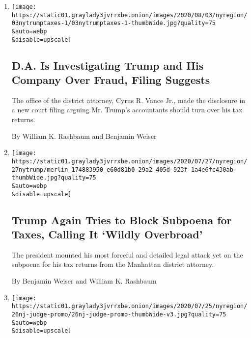 \begin{enumerate}
\def\labelenumi{\arabic{enumi}.}
\item
  \href{/2020/08/03/nyregion/donald-trump-taxes-cyrus-vance.html}{}

  \texttt{[image: https://static01.graylady3jvrrxbe.onion/images/2020/08/03/nyregion/03nytrumptaxes-1/03nytrumptaxes-1-thumbWide.jpg?quality=75\\\&auto=webp\\\&disable=upscale]}

  \hypertarget{da-is-investigating-trump-and-his-company-over-fraud-filing-suggests}{%
  \subsection{D.A. Is Investigating Trump and His Company Over Fraud,
  Filing
  Suggests}\label{da-is-investigating-trump-and-his-company-over-fraud-filing-suggests}}

  The office of the district attorney, Cyrus R. Vance Jr., made the
  disclosure in a new court filing arguing Mr. Trump's accountants
  should turn over his tax returns.

  By William K. Rashbaum and Benjamin Weiser
\item
  \href{/2020/07/27/nyregion/donald-trump-taxes-cyrus-vance.html}{}

  \texttt{[image: https://static01.graylady3jvrrxbe.onion/images/2020/07/27/nyregion/27nytrump/merlin\_174883950\_e60d81b0-29a2-405d-923f-1a4e6fc430ab-thumbWide.jpg?quality=75\\\&auto=webp\\\&disable=upscale]}

  \hypertarget{trump-again-tries-to-block-subpoena-for-taxes-calling-it-wildly-overbroad}{%
  \subsection{Trump Again Tries to Block Subpoena for Taxes, Calling It
  `Wildly
  Overbroad'}\label{trump-again-tries-to-block-subpoena-for-taxes-calling-it-wildly-overbroad}}

  The president mounted his most forceful and detailed legal attack yet
  on the subpoena for his tax returns from the Manhattan district
  attorney.

  By Benjamin Weiser and William K. Rashbaum
\item
  \href{/2020/07/26/nyregion/roy-den-hollander-judge.html}{}

  \texttt{[image: https://static01.graylady3jvrrxbe.onion/images/2020/07/25/nyregion/26nj-judge-promo/26nj-judge-promo-thumbWide-v3.jpg?quality=75\\\&auto=webp\\\&disable=upscale]}


\end{enumerate}
